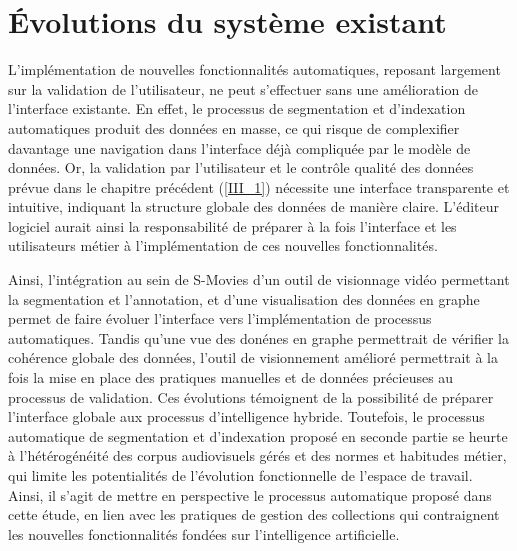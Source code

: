 \chapter{\label{III_2} Évolutions du système existant}

L'implémentation de nouvelles fonctionnalités automatiques, reposant largement sur la validation de l'utilisateur, ne peut s'effectuer sans une amélioration de l'interface existante. En effet, le processus de segmentation et d'indexation automatiques produit des données en masse, ce qui risque de complexifier davantage une navigation dans l'interface déjà compliquée par le modèle de données. Or, la validation par l'utilisateur et le contrôle qualité des données prévue dans le chapitre précédent (\ref{III_1}) nécessite une interface transparente et intuitive, indiquant la structure globale des données de manière claire. L'éditeur logiciel aurait ainsi la responsabilité de préparer à la fois l'interface et les utilisateurs métier à l'implémentation de ces nouvelles fonctionnalités.








Ainsi, l'intégration au sein de S-Movies d'un outil de visionnage vidéo permettant la segmentation et l'annotation, et d'une visualisation des données en graphe permet de faire évoluer l'interface vers l'implémentation de processus automatiques. Tandis qu'une vue des donénes en graphe permettrait de vérifier la cohérence globale des données, l'outil de visionnement amélioré permettrait à la fois la mise en place des pratiques manuelles et de données précieuses au processus de validation. Ces évolutions témoignent de la possibilité de préparer l'interface globale aux processus d'intelligence hybride.
Toutefois, le processus automatique de segmentation et d'indexation proposé en seconde partie se heurte à l'hétérogénéité des corpus audiovisuels gérés et des normes et habitudes métier, qui limite les potentialités de l'évolution fonctionnelle de l'espace de travail. Ainsi, il s'agit de mettre en perspective le processus automatique proposé dans cette étude, en lien avec les pratiques de gestion des collections qui contraignent les nouvelles fonctionnalités fondées sur l'intelligence artificielle.






